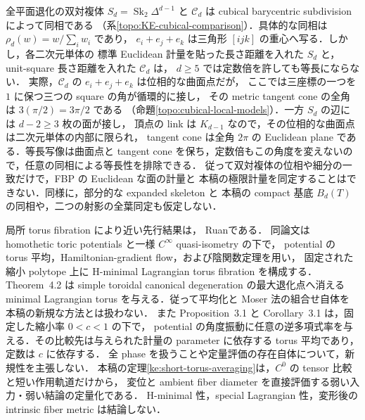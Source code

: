 \begin{remark}[双対複体の位相と極限計量]\label{intro:dual-complex-metric-scope}
全平面退化の双対複体 $S_d=\operatorname{Sk}_2\Delta^{d-1}$ と
$\mathcal C_d$ は cubical barycentric subdivision によって同相である
（系\ref{topo:KE-cubical-comparison}）．具体的な同相は $\rho_d(w)=w/\sum_iw_i$ であり，
$e_i+e_j+e_k$ は三角形 $[ijk]$ の重心へ写る．しかし，各二次元単体の
標準 Euclidean 計量を貼った長さ距離を入れた $S_d$ と，
unit-square 長さ距離を入れた $\mathcal C_d$ は，
$d\ge5$ では定数倍を許しても等長にならない．
実際，$\mathcal C_d$ の $e_i+e_j+e_k$ は位相的な曲面点だが，
ここでは三座標の一つを $1$ に保つ三つの square の角が循環的に接し，
その metric tangent cone の全角は $3(\pi/2)=3\pi/2$ である
（命題\ref{topo:cubical-local-models}）．一方 $S_d$ の辺には $d-2\ge3$ 枚の面が接し，
頂点の link は $K_{d-1}$ なので，その位相的な曲面点は二次元単体の内部に限られ，
tangent cone は全角 $2\pi$ の Euclidean plane である．等長写像は曲面点と
tangent cone を保ち，定数倍もこの角度を変えないので，任意の同相による等長性を排除できる．
従って双対複体の位相や細分の一致だけで，FBP の Euclidean な面の計量と
本稿の極限計量を同定することはできない．同様に，部分的な expanded skeleton と
本稿の compact 基底 $B_d(T)$ の同相や，二つの射影の全葉同定も仮定しない．
\end{remark}

局所 torus fibration により近い先行結果は，
Ruan\cite[Proposition~3.1, Lemma~3.3, Theorem~3.1]{RuanHMinimal}である．
同論文は homothetic toric potentials と一様 $C^\infty$ quasi-isometry の下で，
potential の torus 平均，Hamiltonian-gradient flow，および陰関数定理を用い，
固定された縮小 polytope 上に H-minimal Lagrangian torus fibration を構成する．
Theorem~4.2 は simple toroidal canonical degeneration の最大退化点へ消える
minimal Lagrangian torus を与える．従って平均化と Moser 法の組合せ自体を
本稿の新規な方法とは扱わない．
また Proposition~3.1 と Corollary~3.1 は，固定した縮小率 $0<c<1$ の下で，
potential の角度振動に任意の逆多項式率を与える．その比較先は与えられた計量の
parameter に依存する torus 平均であり，定数は $c$ に依存する．
全 phase を扱うことや定量評価の存在自体について，新規性を主張しない．
本稿の定理\ref{ke:short-torus-averaging}は，$C^0$ の tensor 比較と短い作用軌道だけから，
変位と ambient fiber diameter を直接評価する弱い入力・弱い結論の定量化である．
H-minimal 性，special Lagrangian 性，変形後の intrinsic fiber metric は結論しない．

